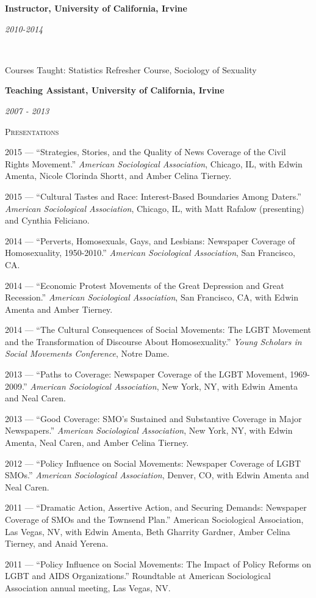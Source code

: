 \documentclass[11pt]{article}
\newcommand{\sectionheader}[1]{
{\Large
\textsc{#1}}
}
\newcommand{\resumeitem}[2]{
\begin{minipage}{0.7\textwidth}
\begin{flushleft}
\textbf{#1}
\end{flushleft}
\end{minipage}
\begin{minipage}{0.3\textwidth}
\begin{flushright}
\emph{#2}
\end{flushright}
\end{minipage}
\hangindent=0.05\textwidth
}
\newcommand{\resumesubitem}[2]{
\begin{minipage}{0.65\textwidth}
\begin{flushleft}
#1
\end{flushleft}
\end{minipage}
\begin{minipage}{0.3\textwidth}
\begin{flushright}
#2
\end{flushright}
\end{minipage}
\hangindent=0.05\textwidth
}
\begin{document}
\resumeitem{Instructor, University of California, Irvine}{2010-2014}\\
\resumesubitem{Courses Taught: Statistics Refresher Course, Sociology of Sexuality}{}


\resumeitem{Teaching Assistant, University of California, Irvine}{2007 - 2013}


\sectionheader{Presentations}

2015 --- ``Strategies, Stories, and the Quality of News Coverage of the Civil Rights Movement.'' \textit{American Sociological Association}, Chicago, IL, with Edwin Amenta, Nicole Clorinda Shortt, and Amber Celina Tierney.

2015 --- ``Cultural Tastes and Race: Interest-Based Boundaries Among Daters.'' \textit{American Sociological Association}, Chicago, IL, with Matt Rafalow (presenting) and Cynthia Feliciano.

2014 --- ``Perverts, Homosexuals, Gays, and Lesbians: Newspaper Coverage of Homosexuality, 1950-2010.'' \textit{American Sociological Association}, San Francisco, CA. 

2014 --- ``Economic Protest Movements of the Great Depression and Great Recession.'' \textit{American Sociological Association}, San Francisco, CA, with Edwin Amenta and Amber Tierney.

2014 --- ``The Cultural Consequences of Social Movements: The LGBT Movement and the Transformation of Discourse About Homosexuality.'' \textit{Young Scholars in Social Movements Conference}, Notre Dame.

2013 --- ``Paths to Coverage: Newspaper Coverage of the LGBT Movement, 1969-2009.'' \textit{American Sociological Association}, New York, NY, with Edwin Amenta and Neal Caren.

2013 --- ``Good Coverage: SMO's Sustained and Substantive Coverage in Major Newspapers.'' \textit{American Sociological Association}, New York, NY, with Edwin Amenta, Neal Caren, and Amber Celina Tierney.

2012 --- ``Policy Influence on Social Movements: Newspaper Coverage of LGBT SMOs.'' \textit{American Sociological Association}, Denver, CO, with Edwin Amenta and Neal Caren.

2011 --- ``Dramatic Action, Assertive Action, and Securing Demands: Newspaper Coverage of SMOs and the Townsend Plan.'' American Sociological Association, Las Vegas, NV, with Edwin Amenta, Beth Gharrity Gardner, Amber Celina Tierney, and Anaid Yerena.

2011 --- ``Policy Influence on Social Movements: The Impact of Policy Reforms on LGBT and AIDS Organizations.'' Roundtable at American Sociological Association annual meeting, Las Vegas, NV.
\end{document}
